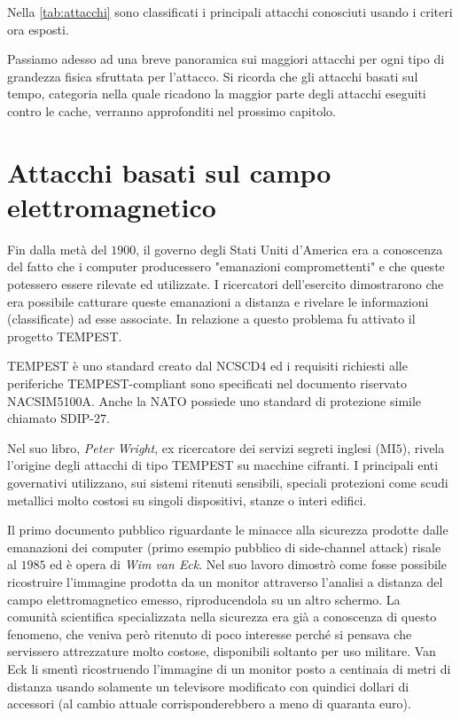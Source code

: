 			Nella \cref{tab:attacchi} sono classificati i principali attacchi conosciuti usando i criteri ora esposti.
			
			Passiamo adesso ad una breve panoramica sui maggiori attacchi per ogni tipo di grandezza fisica sfruttata per l'attacco. Si ricorda che gli attacchi basati sul tempo, categoria nella quale ricadono la maggior parte degli attacchi eseguiti contro le cache, verranno approfonditi nel prossimo capitolo.
			
	\section{Attacchi basati sul campo elettromagnetico}
		Fin dalla metà del $1900$, il governo degli Stati Uniti d'America era a conoscenza del fatto che i computer producessero "emanazioni compromettenti" e che queste potessero essere rilevate ed utilizzate. I ricercatori dell'esercito dimostrarono che era possibile catturare queste emanazioni a distanza e rivelare le informazioni (classificate) ad esse associate. In relazione a questo problema fu attivato il progetto \ac{TEMPEST}.
		
		TEMPEST è uno standard creato dal \ac{NCSCD4} ed i requisiti richiesti alle periferiche TEMPEST-compliant sono specificati nel documento riservato NACSIM5100A. Anche la \ac{NATO} possiede uno standard di protezione simile chiamato SDIP-$27$.
		
		Nel suo libro\cite{wright1987spycatcher}, \emph{Peter Wright}, ex ricercatore dei servizi segreti inglesi (MI$5$), rivela l'origine degli attacchi di tipo TEMPEST su macchine cifranti. I principali enti governativi utilizzano, sui sistemi ritenuti sensibili, speciali protezioni come scudi metallici molto costosi su singoli dispositivi, stanze o interi edifici\cite{herndon1990electromagnetic}.
		
		Il primo documento pubblico riguardante le minacce alla sicurezza prodotte dalle emanazioni dei computer (primo esempio pubblico di side-channel attack) risale al $1985$ ed è opera di \emph{Wim van Eck}\cite{van1985electromagn}. Nel suo lavoro dimostrò come fosse possibile ricostruire l'immagine prodotta da un monitor attraverso l'analisi a distanza del campo elettromagnetico emesso, riproducendola su un altro schermo. La comunità scientifica specializzata nella sicurezza era già a conoscenza di questo fenomeno, che veniva però ritenuto di poco interesse perché si pensava che servissero attrezzature molto costose, disponibili soltanto per uso militare. Van Eck li smentì ricostruendo l'immagine di un monitor posto a centinaia di metri di distanza usando solamente un televisore modificato con quindici dollari di accessori (al cambio attuale corrisponderebbero a meno di quaranta euro).
		
